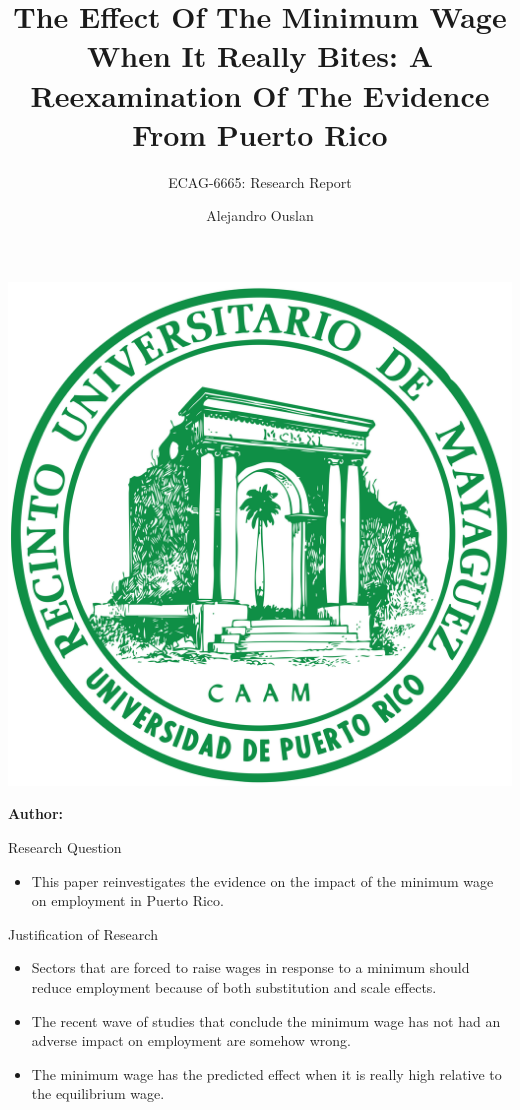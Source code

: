 \documentclass[12pt]{beamer}
\title[]{The Effect Of The Minimum Wage When It Really Bites: A Reexamination Of The Evidence From Puerto Rico}
\subtitle{ECAG-6665: Research Report}
\author[Name Surname]{Alejandro Ouslan}
\institute[institute]{University of Puerto Rico}
\date{} %
\begin{document}
\begin{frame}{}
	\vspace{\fill}

	\includegraphics[width=0.16\linewidth]{../../assets/uprm_logo.png}

	\vspace{\fill}

	\Large
	\color{main}
	\inserttitle

	\medskip

	\large
	\color{black}
	\insertsubtitle

	\vspace{\fill}

	\footnotesize
	\insertinstitute

	\vspace{\fill}

	\textbf{Author:} \insertauthor

	\medskip

	\insertdate

	\vspace{\fill}
\end{frame}

\begin{frame}[allowframebreaks]{Research Question}
	\begin{itemize}
		\item This paper reinvestigates the evidence on the impact of the minimum wage on employment in Puerto Rico. \cite{krueger1994effect}
	\end{itemize}

\end{frame}

\begin{frame}[allowframebreaks]{Justification of Research}
	\begin{itemize}
		\item Sectors that are forced to raise wages in response to a minimum should reduce employment because of both substitution
		      and scale effects.
		\item The recent wave of studies that conclude the minimum wage has not had an adverse impact on employment are somehow wrong.
		\item The minimum wage has the predicted effect when it is really high relative to the equilibrium wage.
	\end{itemize}

\end{frame}
\end{document}
